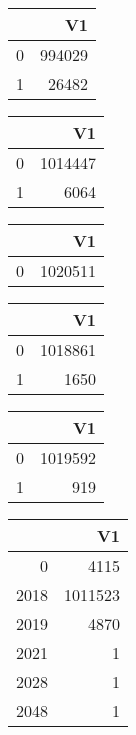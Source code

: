 \bigskip\bigskip
\centering
\begin{tabular}{rr}
  \hline
 & V1 \\ 
  \hline
0 & 994029 \\ 
  1 & 26482 \\ 
   \hline
\end{tabular}

\bigskip\bigskip
\centering
\begin{tabular}{rr}
  \hline
 & V1 \\ 
  \hline
0 & 1014447 \\ 
  1 & 6064 \\ 
   \hline
\end{tabular}

\bigskip\bigskip
\centering
\begin{tabular}{rr}
  \hline
 & V1 \\ 
  \hline
0 & 1020511 \\ 
   \hline
\end{tabular}

\bigskip\bigskip
\centering
\begin{tabular}{rr}
  \hline
 & V1 \\ 
  \hline
0 & 1018861 \\ 
  1 & 1650 \\ 
   \hline
\end{tabular}

\bigskip\bigskip
\centering
\begin{tabular}{rr}
  \hline
 & V1 \\ 
  \hline
0 & 1019592 \\ 
  1 & 919 \\ 
   \hline
\end{tabular}

\bigskip\bigskip
\centering
\begin{tabular}{rr}
  \hline
 & V1 \\ 
  \hline
0 & 4115 \\ 
  2018 & 1011523 \\ 
  2019 & 4870 \\ 
  2021 &   1 \\ 
  2028 &   1 \\ 
  2048 &   1 \\ 
   \hline
\end{tabular}

